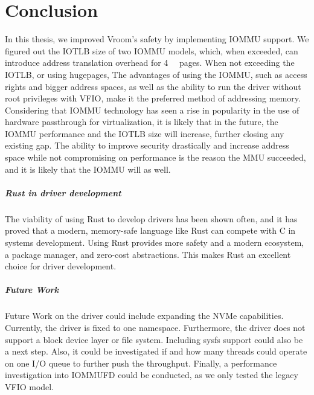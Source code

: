 \chapter{Conclusion}
In this thesis, we improved Vroom's safety by implementing IOMMU support.
We figured out the IOTLB size of two IOMMU models, which, when exceeded, can introduce address translation overhead for \qty{4}{\kibi\byte} pages.
When not exceeding the IOTLB, or using hugepages,
The advantages of using the IOMMU, such as access rights and bigger address spaces, as well as the ability to run the driver without root privileges with VFIO, make it the preferred method of addressing memory.
Considering that IOMMU technology has seen a rise in popularity in the use of hardware passthrough for virtualization, it is likely that in the future, the IOMMU performance and the IOTLB size will increase, further closing any existing gap. The ability to improve security drastically and increase address space while not compromising on performance is the reason the MMU succeeded, and it is likely that the IOMMU will as well.

\paragraph{Rust in driver development}
The viability of using Rust to develop drivers has been shown often, and it has proved that a modern, memory-safe language like Rust can compete with C in systems development. Using Rust provides more safety and a modern ecosystem, a package manager, and zero-cost abstractions. This makes Rust an excellent choice for driver development.

\paragraph{Future Work}
Future Work on the driver could include expanding the NVMe capabilities. Currently, the driver is fixed to one namespace. Furthermore, the driver does not support a block device layer or file system. Including sysfs support could also be a next step.
Also, it could be investigated if and how many threads could operate on one I/O queue to further push the throughput. Finally, a performance investigation into IOMMUFD could be conducted, as we only tested the legacy VFIO model.